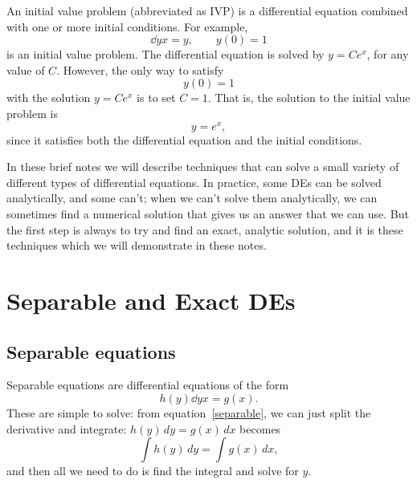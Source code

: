 \documentclass[10pt,driverfallback=hypertex]{report}
\newcounter{small}
\begin{document}
An initial value problem (abbreviated as IVP) is a differential
equation combined with one or more initial conditions. For example,
\begin{dmath*}[compact]
  \dd{y}{x}=y, \qquad y(0)=1
\end{dmath*}
is an initial value problem.  The differential equation is solved by
$y=Ce^x$, for any value of $C$. However, the only way to satisfy
\begin{dmath*}
  y(0)=1
\end{dmath*}
with the solution $y=Ce^x$ is to set $C=1$. That is, the solution to
the initial value problem is
\begin{dmath*}
  y=e^x,
\end{dmath*}
since it satisfies both the differential equation and the initial
conditions.

In these brief notes we will describe techniques that can solve a
small variety of different types of differential equations.  In
practice, some DEs can be solved analytically, and some can't; when we
can't solve them analytically, we can sometimes find a numerical
solution that gives us an answer that we can use.  But the first step
is always to try and find an exact, analytic solution, and it is these
techniques which we will demonstrate in these notes.


\chapter{Separable and Exact DEs}

\section{Separable equations}

Separable equations are differential equations of the form
\begin{dmath}
  \label{separable}
  \boxed{h(y) \dd{y}{x} = g(x)}.
\end{dmath}
These are simple to solve: from equation~\eqref{separable}, we can
just split the derivative and integrate: $ h(y)\, dy = g(x) \, dx$
becomes
\begin{dmath*}
  \boxed{  \int h(y) \, dy = \int g(x) \, dx},
\end{dmath*}
and then all we need to do is find the integral and solve for $y$.\\
\end{document}
